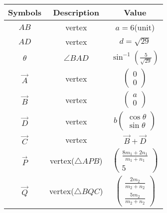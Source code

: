 \begin{tabular}{|c|c|c|}
\hline
    \textbf{Symbols} &\textbf{Description}&\textbf{Value} \\
    \hline
     $AB$& vertex &$a = 6$(unit)\\
     \hline
     $AD$& vertex &$d = \sqrt{29}$\\
     \hline
     $\theta$& $\angle BAD $& $\sin^{-1}(\frac{5}{\sqrt{29}})$\\
     \hline
     $\vec{A}$& vertex &$\begin{pmatrix}
     0\\0
     \end{pmatrix}$\\
     \hline
     $\vec{B}$& vertex &$\begin{pmatrix}
     a\\0
     \end{pmatrix}$\\
     \hline
     $\vec{D}$& vertex &$b\begin{pmatrix}
    \cos{\theta} \\\sin{\theta}
     \end{pmatrix}$\\
     \hline
     $\vec{C}$& vertex & $\vec{B}+\vec{D}$\\
     \hline
     $\vec{ P}$& vertex($\triangle APB$) &$\begin{pmatrix}
     \frac{8m_1+2n_1}{m_1+n_1}\\5
     \end{pmatrix}$\\
     \hline
      $\vec{Q}$& vertex($\triangle BQC$) &$\begin{pmatrix}
     \frac{2m_2}{m_2+n_2}\\\frac{5m_2}{m_2+n_2}
     \end{pmatrix}$\\
     \hline
     
     
\end{tabular}
